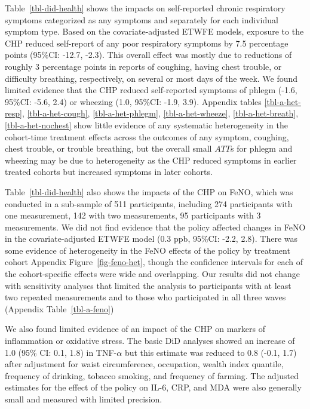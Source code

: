 \documentclass[
  letterpaper,
  DIV=11,
  numbers=noendperiod]{scrartcl}
\begin{document}
Table~\ref{tbl-did-health} shows the impacts on self-reported chronic
respiratory symptoms categorized as any symptoms and separately for each
individual symptom type. Based on the covariate-adjusted ETWFE models,
exposure to the CHP reduced self-report of any poor respiratory symptoms
by 7.5 percentage points (95\%CI: -12.7, -2.3). This overall effect was
mostly due to reductions of roughly 3 percentage points in reports of
coughing, having chest trouble, or difficulty breathing, respectively,
on several or most days of the week. We found limited
evidence that the CHP reduced self-reported symptoms of phlegm (-1.6,
95\%CI: -5.6, 2.4) or wheezing (1.0, 95\%CI: -1.9, 3.9). Appendix tables
\ref{tbl-a-het-resp}, \ref{tbl-a-het-cough}, \ref{tbl-a-het-phlegm},
\ref{tbl-a-het-wheeze}, \ref{tbl-a-het-breath}, \ref{tbl-a-het-nochest}
show little evidence of any systematic heterogeneity in the cohort-time
treatment effects across the outcomes of any symptom, coughing, chest
trouble, or trouble breathing, but the overall small \(ATT\)s for phlegm
and wheezing may be due to heterogeneity as the CHP reduced symptoms in
earlier treated cohorts but increased symptoms in later cohorts.

Table~\ref{tbl-did-health} also shows the impacts of the CHP on FeNO,
which was conducted in a sub-sample of 511 participants, including 274
participants with one measurement, 142 with two measurements, 95
participants with 3 measurements. We did not find evidence that the
policy affected changes in FeNO in the covariate-adjusted ETWFE
model (0.3 ppb, 95\%CI: -2.2, 2.8). There was some
evidence of heterogeneity in the FeNO effects of the policy by treatment
cohort Appendix Figure~\ref{fig-feno-het}, though the confidence
intervals for each of the cohort-specific effects were wide and
overlapping. Our results did not change with sensitivity analyses that
limited the analysis to participants with at least two repeated
measurements and to those who participated in all three waves (Appendix
Table~\ref{tbl-a-feno})

We also found limited evidence of an impact of the CHP on
markers of inflammation or oxidative stress. The basic DiD analyses
showed an increase of 1.0 (95\% CI: 0.1, 1.8) in TNF-\(\alpha\) but this
estimate was reduced to 0.8 (-0.1, 1.7) after adjustment for waist
circumference, occupation, wealth index quantile, frequency of drinking,
tobacco smoking, and frequency of farming. The adjusted estimates for
the effect of the policy on IL-6, CRP, and MDA were also generally small
and measured with limited precision.
\end{document}
